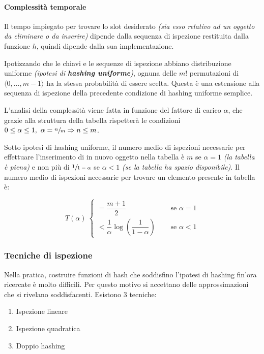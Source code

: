 \documentclass[italian, 10pt]{article}
\begin{document}
\paragraph{Complessità temporale}

Il tempo impiegato per trovare lo slot desiderato \textit{(sia esso relativo ad un oggetto da eliminare o da inserire)} dipende dalla sequenza di ispezione restituita dalla funzione \(h\), quindi dipende dalla sua implementazione.

Ipotizzando che le chiavi e le sequenze di ispezione abbiano distribuzione uniforme \textit{(ipotesi di \textbf{hashing uniforme})}, ognuna delle \(m!\) permutazioni di \(\langle 0, \ldots, m-1 \rangle\) ha la stessa probabilità di essere scelta.
Questa è una estensione alla sequenza di ispezione della precedente condizione di hashing uniforme semplice.

L'analisi della complessità viene fatta in funzione del fattore di carico \(\alpha\), che grazie alla struttura della tabella rispetterà le condizioni \(0 \leq \alpha \leq 1,\ \alpha = \sfrac{n}{m} \Rightarrow n \leq m\).

Sotto ipotesi di hashing uniforme, il numero medio di ispezioni necessarie per effettuare l'inserimento di in nuovo oggetto nella tabella è \(m\) se \(\alpha = 1\) \textit{(la tabella è piena)} e non più di \(\sfrac{1}{1-\alpha}\) se \(\alpha<1\) \textit{(se la tabella ha spazio disponibile)}.
Il numero medio di ispezioni necessarie per trovare un elemento presente in tabella è:

\[  T(\alpha) \ \begin{cases}
    = \dfrac{m+1}{2}                                         & \quad \text{ se } \alpha = 1 \\[5pt]
    < \dfrac{1}{\alpha} \log\left(\dfrac{1}{1-\alpha}\right) & \quad \text{ se } \alpha < 1
  \end{cases}  \]

\subsubsection{Tecniche di ispezione}

Nella pratica, costruire funzioni di hash che soddisfino l'ipotesi di hashing fin'ora ricercate è molto difficili.
Per questo motivo si accettano delle approssimazioni che si rivelano soddisfacenti.
Esistono \(3\) tecniche:

\begin{enumerate}
  \item Ispezione lineare
  \item Ispezione quadratica
  \item Doppio hashing
\end{enumerate}
\end{document}
